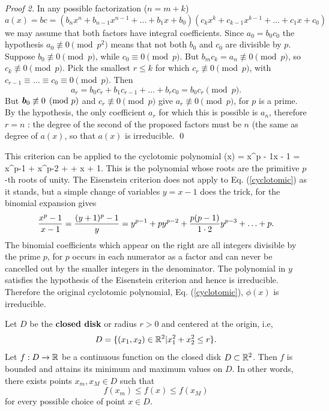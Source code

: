 \begin{proof}[Proof 2]
In any possible factorization ($n = m + k$)
\[ a(x) = bc = (b_n x^n + b_{n-1} x^{n-1} + \hdots + b_1x + b_0) (c_k x^k + c_{k-1} x^{k-1} + \hdots + c_1 x + c_0) \] we may assume that both factors have integral coefficients. 
Since $a_0 = b_0 c_0$ the hypothesis $a_0 \not\equiv 0 \pmod{p^2}$ means that not both $b_0$ and $c_0$ are divisible by $p$. Suppose $b_0 \not\equiv 0 \pmod{p}$, while $c_0 \equiv 0 \pmod{p}$.  
 But $b_m c_k = a_n \not\equiv 0 \pmod{p}$, so $c_k \not\equiv 0 \pmod{p}$.
Pick the smallest $r\le k$ for which $c_r \not\equiv 0 \pmod{p}$, with 
$c_{r-1} \equiv \hdots \equiv c_0 \equiv 0 \pmod{p}$. Then 
\[ a_r = b_0 c_r + b_1 c_{r-1} + \hdots + b_r c_0 = b_0 c_r \pmod{p}.\]
But $\boldsymbol{b}_0 \not\equiv 0 \pmod{p}$ and $c_r \not\equiv 0 \pmod{p}$ give $a_r \not\equiv 0 \pmod{p}$, for $p$ is a prime. By the hypothesis, the only coefficient $a_r$ for which this is possible is $a_n$, therefore $r = n$ : the degree of the second of the proposed factors must be $n$ (the same as degree of $a(x)$, so that $a(x)$ is irreducible. \qed
\end{proof}

This criterion can be applied to the cyclotomic polynomial 
\be \phi(x) = {x^p - 1\over x - 1}  = x^{p-1} + x^{p-2} + \hdots + x + 1. \label{cyclotomic} \ee
This is the polynomial whose roots are the primitive $p$-th roots of unity. The Eisenstein criterion does not apply to Eq. (\ref{cyclotomic}) as it stands, but a simple change of variables $y = x -1 $ does the trick, for the 
binomial expansion gives 
\[ {x^p - 1\over x - 1}  = {(y+1)^p - 1\over y} = y^{p-1} + p y^{p-2} + {p(p-1)\over 1\cdot 2} y ^{p-3} + \hdots  + p.\]
The binomial coefficients which appear on the right are all integers divisible by the prime $p$, for $p$ occurs in each numerator as a factor and can never be cancelled out by the smaller integers in the denominator. The polynomial in $y$ satisfies the hypothesis of the Eisenstein criterion and hence is irreducible. Therefore the original cyclotomic polynomial, Eq. (\ref{cyclotomic}), $\phi(x)$ is irreducible. 

\begin{theorem}
Let $D$ be the {\bf closed disk} or radius $r>0$ and centered at the origin, i.e, 
\[ D = \{(x_1,  x_2) \in \mathbb{R}^2 | x_1^2 + x_2^2 \le r\}. \]
Let $f: D \rightarrow \mathbb{R}$ be a continuous function on the closed disk $D \subset \mathbb{R}^2$. Then $f$ is bounded and attains its minimum and maximum values on $D$. In other words, there exists points
$x_m, x_M \in D$ such that \[ f(x_m) \le f(x) \le f(x_M) \] for every possible choice of point $x \in D$. \label{ExtremeValue}
\end{theorem}

